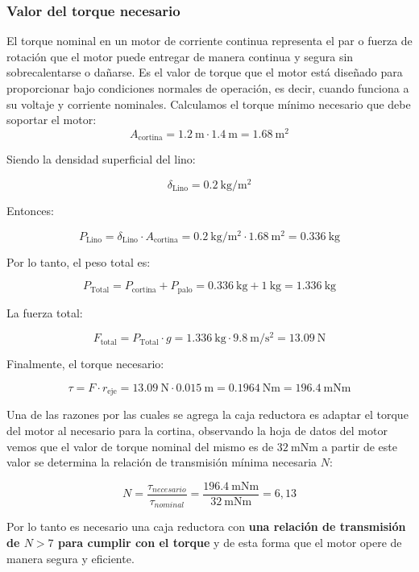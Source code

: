 \subsubsection{Valor del torque necesario}

El torque nominal en un motor de corriente continua representa el par o
fuerza de rotación que el motor puede entregar de manera continua y segura
sin sobrecalentarse o dañarse. Es el valor de torque que el motor está diseñado
para proporcionar bajo condiciones normales de operación, es decir, cuando
funciona a su voltaje y corriente nominales.
Calculamos el torque mínimo necesario que debe soportar el motor:
\[
A_{\text{cortina}} = \SI{1,2}{\meter} \cdot \SI{1,4}{\meter} = \SI{1,68}{\meter\squared}
\]

Siendo la densidad superficial del lino:

\[
\delta_{\text{Lino}} = \SI{0,2}{\kilogram\per\square\meter}
\]

Entonces:

\[
P_{\text{Lino}} = \delta_{\text{Lino}} \cdot A_{\text{cortina}} = \SI{0,2}{\kilogram\per\square\meter} \cdot \SI{1,68}{\square\meter} = \SI{0,336}{\kilogram}
\]

Por lo tanto, el peso total es:

\[
P_{\text{Total}} = P_{\text{cortina}} + P_{\text{palo}} = \SI{0,336}{\kilogram} + \SI{1}{\kilogram} = \SI{1,336}{\kilogram}
\]

La fuerza total:

\[
F_{\text{total}} = P_{\text{Total}} \cdot g = \SI{1,336}{\kilogram} \cdot \SI{9,8}{\meter\per\second\squared} = \SI{13,09}{\newton}
\]

Finalmente, el torque necesario:

\[
\tau = F \cdot r_{\text{eje}} = \SI{13,09}{\newton} \cdot \SI{0,015}{\meter} = \SI{0,1964}{\newton\meter} = \SI{196,4}{\milli\newton\meter}
\]

Una de las razones por las cuales se agrega la caja reductora es adaptar el torque del motor al necesario para la cortina, observando la hoja de datos del motor vemos que el valor de torque nominal del mismo es de $\SI{32}{\milli\newton\meter}$ a partir de este valor se determina la relación de transmisión mínima necesaria $N$:

\[
N = \frac{\tau_{necesario}}{\tau_{nominal}} = \frac{\SI{196,4}{\milli\newton\meter}}{\SI{32}{\milli\newton\meter}} = 6,13
\]

Por lo tanto es necesario una caja reductora con \textbf{una relación de transmisión de $N>7$ para cumplir con el torque} y de esta forma que el motor opere de manera segura y eficiente.

